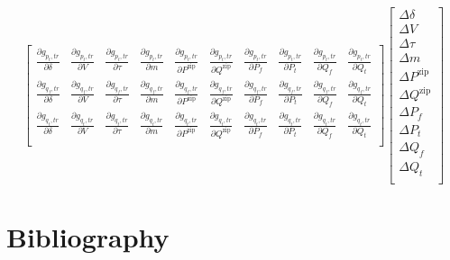 \documentclass[11pt]{article}
\begin{document}
\begin{equation}
\begin{bmatrix}
		\frac{\partial g_{p_t,tr}}{\partial \delta} & \frac{\partial g_{p_t,tr}}{\partial V} & \frac{\partial g_{p_t,tr}}{\partial \tau} & \frac{\partial g_{p_t,tr}}{\partial m} & \frac{\partial g_{p_t,tr}}{\partial P^\text{zip}} & \frac{\partial g_{p_t,tr}}{\partial Q^\text{zip}} & \frac{\partial g_{p_t,tr}}{\partial P_f} & \frac{\partial g_{p_t,tr}}{\partial P_t} & \frac{\partial g_{p_t,tr}}{\partial Q_f} & \frac{\partial g_{p_t,tr}}{\partial Q_t} \\
		\frac{\partial g_{q_f,tr}}{\partial \delta} & \frac{\partial g_{q_f,tr}}{\partial V} & \frac{\partial g_{q_f,tr}}{\partial \tau} & \frac{\partial g_{q_f,tr}}{\partial m} & \frac{\partial g_{q_f,tr}}{\partial P^\text{zip}} & \frac{\partial g_{q_f,tr}}{\partial Q^\text{zip}} & \frac{\partial g_{q_f,tr}}{\partial P_f} & \frac{\partial g_{q_f,tr}}{\partial P_t} & \frac{\partial g_{q_f,tr}}{\partial Q_f} & \frac{\partial g_{q_f,tr}}{\partial Q_t} \\
		\frac{\partial g_{q_t,tr}}{\partial \delta} & \frac{\partial g_{q_t,tr}}{\partial V} & \frac{\partial g_{q_t,tr}}{\partial \tau} & \frac{\partial g_{q_t,tr}}{\partial m} & \frac{\partial g_{q_t,tr}}{\partial P^\text{zip}} & \frac{\partial g_{q_t,tr}}{\partial Q^\text{zip}} & \frac{\partial g_{q_t,tr}}{\partial P_f} & \frac{\partial g_{q_t,tr}}{\partial P_t} & \frac{\partial g_{q_t,tr}}{\partial Q_f} & \frac{\partial g_{q_t,tr}}{\partial Q_t} \\
	\end{bmatrix}
	\begin{bmatrix}
		\Delta \delta \\
		\Delta V \\
		\Delta \tau \\
		\Delta m \\
		\Delta P^\text{zip} \\
		\Delta Q^\text{zip} \\
		\Delta P_f \\
		\Delta P_t \\
		\Delta Q_f \\
		\Delta Q_t \\
	\end{bmatrix}
\end{equation}
	
\section{Bibliography}
	\printbibliography
	
\end{document}
